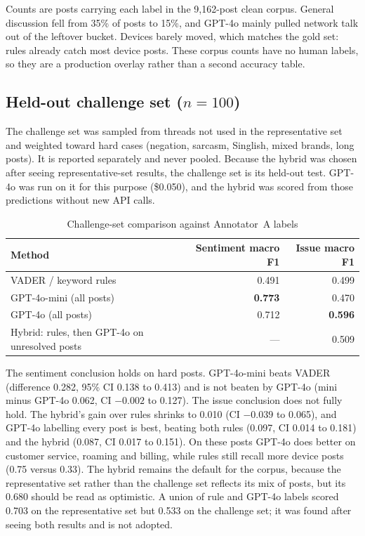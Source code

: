 \documentclass[11pt,a4paper]{article}
\begin{document}
Counts are posts carrying each label in the 9,162-post clean corpus. General discussion fell from 35\% of posts to 15\%, and GPT-4o mainly pulled network talk out of the leftover bucket. Devices barely moved, which matches the gold set: rules already catch most device posts. These corpus counts have no human labels, so they are a production overlay rather than a second accuracy table.

\subsection{Held-out challenge set ($n=100$)}
\label{sec:challenge}

The challenge set was sampled from threads not used in the representative set and weighted toward hard cases (negation, sarcasm, Singlish, mixed brands, long posts). It is reported separately and never pooled. Because the hybrid was chosen after seeing representative-set results, the challenge set is its held-out test. GPT-4o was run on it for this purpose (\$0.050), and the hybrid was scored from those predictions without new API calls.

\begin{table}[H]
\centering
\caption{Challenge-set comparison against Annotator~A labels}
\label{tab:challenge}
\begin{tabular}{lrr}
\toprule
\textbf{Method} & \textbf{Sentiment macro F1} & \textbf{Issue macro F1} \\
\midrule
VADER / keyword rules & 0.491 & 0.499 \\
GPT-4o-mini (all posts) & \textbf{0.773} & 0.470 \\
GPT-4o (all posts) & 0.712 & \textbf{0.596} \\
Hybrid: rules, then GPT-4o on unresolved posts & --- & 0.509 \\
\bottomrule
\end{tabular}
\end{table}

The sentiment conclusion holds on hard posts. GPT-4o-mini beats VADER (difference 0.282, 95\% CI 0.138 to 0.413) and is not beaten by GPT-4o (mini minus GPT-4o 0.062, CI $-0.002$ to 0.127). The issue conclusion does not fully hold. The hybrid's gain over rules shrinks to 0.010 (CI $-0.039$ to 0.065), and GPT-4o labelling every post is best, beating both rules (0.097, CI 0.014 to 0.181) and the hybrid (0.087, CI 0.017 to 0.151). On these posts GPT-4o does better on customer service, roaming and billing, while rules still recall more device posts (0.75 versus 0.33). The hybrid remains the default for the corpus, because the representative set rather than the challenge set reflects its mix of posts, but its 0.680 should be read as optimistic. A union of rule and GPT-4o labels scored 0.703 on the representative set but 0.533 on the challenge set; it was found after seeing both results and is not adopted.
\end{document}
